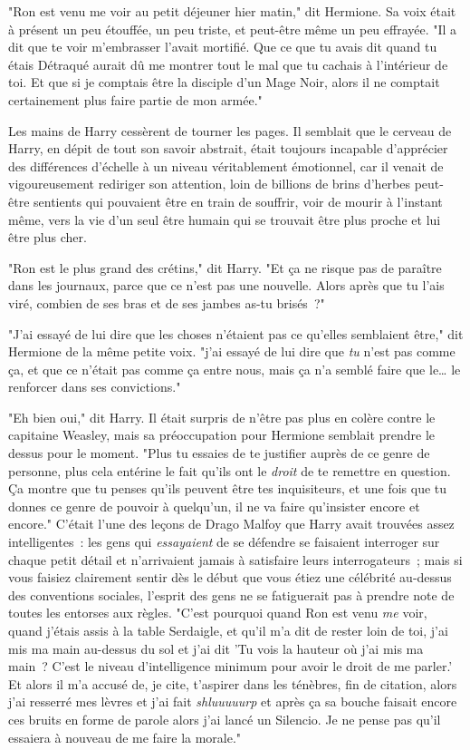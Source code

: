 "Ron est venu me voir au petit déjeuner hier matin," dit Hermione. Sa voix était à présent un peu étouffée, un peu triste, et peut-être même un peu effrayée. "Il a dit que te voir m'embrasser l'avait mortifié. Que ce que tu avais dit quand tu étais Détraqué aurait dû me montrer tout le mal que tu cachais à l'intérieur de toi. Et que si je comptais être la disciple d'un Mage Noir, alors il ne comptait certainement plus faire partie de mon armée."

Les mains de Harry cessèrent de tourner les pages. Il semblait que le cerveau de Harry, en dépit de tout son savoir abstrait, était toujours incapable d'apprécier des différences d'échelle à un niveau véritablement émotionnel, car il venait de vigoureusement rediriger son attention, loin de billions de brins d'herbes peut-être sentients qui pouvaient être en train de souffrir, voir de mourir à l'instant même, vers la vie d'un seul être humain qui se trouvait être plus proche et lui être plus cher.

"Ron est le plus grand des crétins," dit Harry. "Et ça ne risque pas de paraître dans les journaux, parce que ce n'est pas une nouvelle. Alors après que tu l'ais viré, combien de ses bras et de ses jambes as-tu brisés~?"

"J'ai essayé de lui dire que les choses n'étaient pas ce qu'elles semblaient être," dit Hermione de la même petite voix. "j'ai essayé de lui dire que \emph{tu} n'est pas comme ça, et que ce n'était pas comme ça entre nous, mais ça n'a semblé faire que le… le renforcer dans ses convictions."

"Eh bien oui," dit Harry. Il était surpris de n'être pas plus en colère contre le capitaine Weasley, mais sa préoccupation pour Hermione semblait prendre le dessus pour le moment. "Plus tu essaies de te justifier auprès de ce genre de personne, plus cela entérine le fait qu'ils ont le \emph{droit} de te remettre en question. Ça montre que tu penses qu'ils peuvent être tes inquisiteurs, et une fois que tu donnes ce genre de pouvoir à quelqu'un, il ne va faire qu'insister encore et encore." C'était l'une des leçons de Drago Malfoy que Harry avait trouvées assez intelligentes~: les gens qui \emph{essayaient} de se défendre se faisaient interroger sur chaque petit détail et n'arrivaient jamais à satisfaire leurs interrogateurs~; mais si vous faisiez clairement sentir dès le début que vous étiez une célébrité au-dessus des conventions sociales, l'esprit des gens ne se fatiguerait pas à prendre note de toutes les entorses aux règles. "C'est pourquoi quand Ron est venu \emph{me} voir, quand j'étais assis à la table Serdaigle, et qu'il m'a dit de rester loin de toi, j'ai mis ma main au-dessus du sol et j'ai dit 'Tu vois la hauteur où j'ai mis ma main~? C'est le niveau d'intelligence minimum pour avoir le droit de me parler.' Et alors il m'a accusé de, je cite, t'aspirer dans les ténèbres, fin de citation, alors j'ai resserré mes lèvres et j'ai fait \emph{shluuuuurp} et après ça sa bouche faisait encore ces bruits en forme de parole alors j'ai lancé un Silencio. Je ne pense pas qu'il essaiera à nouveau de me faire la morale."

